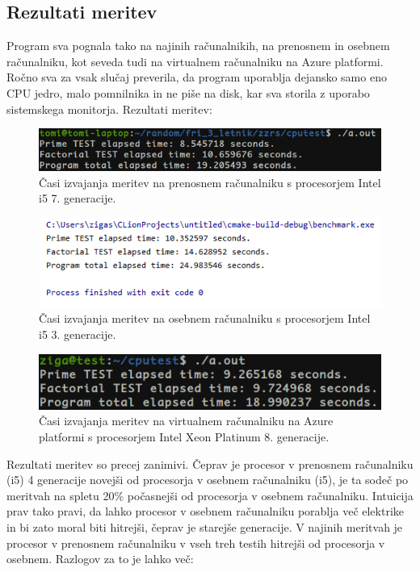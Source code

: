 \subsection{Rezultati meritev}

Program sva pognala tako na najinih računalnikih, na prenosnem in osebnem računalniku, kot seveda tudi na virtualnem računalniku na Azure platformi. Ročno sva za vsak slučaj preverila, da program uporablja dejansko samo eno CPU jedro, malo pomnilnika in ne piše na disk, kar sva storila z uporabo sistemskega monitorja. Rezultati meritev:

\begin{figure}[H]
	\centering
	\includegraphics[scale=0.66]{Img/Tomaz_cputest.png}
	\caption{Časi izvajanja meritev na prenosnem računalniku s procesorjem Intel i5 7. generacije.}
	\label{fig:7_breme2}
\end{figure}

\begin{figure}[H]
	\centering
	\includegraphics[scale=0.8]{Img/Ziga_cputest.png}
	\caption{Časi izvajanja meritev na osebnem računalniku s procesorjem Intel i5 3. generacije.}
	\label{fig:7_breme2}
\end{figure}

\begin{figure}[H]
	\centering
	\includegraphics[scale=0.66]{Img/Azure_cputest.png}
	\caption{Časi izvajanja meritev na virtualnem računalniku na Azure platformi s procesorjem Intel Xeon Platinum 8. generacije.}
	\label{fig:7_breme2}
\end{figure}

Rezultati meritev so precej zanimivi. Čeprav je procesor v prenosnem računalniku (i5) 4 generacije novejši od procesorja v osebnem računalniku (i5), je ta sodeč po meritvah na spletu 20\% počasnejši od procesorja v osebnem računalniku. Intuicija prav tako pravi, da lahko procesor v osebnem računalniku porablja več elektrike in bi zato moral biti hitrejši, čeprav je starejše generacije. V najinih meritvah je procesor v prenosnem računalniku v vseh treh testih hitrejši od procesorja v osebnem. Razlogov za to je lahko več:

